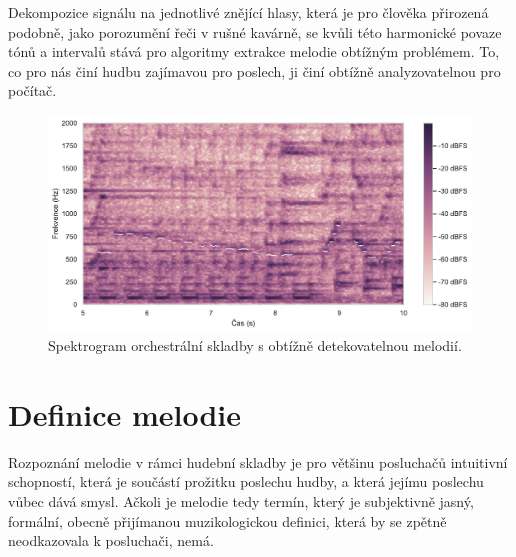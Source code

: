 Dekompozice signálu na jednotlivé znějící hlasy, která je pro člověka přirozená podobně, jako porozumění řeči v rušné kavárně, se kvůli této harmonické povaze tónů a intervalů stává pro algoritmy extrakce melodie obtížným problémem. To, co pro nás činí hudbu zajímavou pro poslech, ji činí obtížně analyzovatelnou pro počítač.



\begin{figure}[h]\centering
\includegraphics[width=\textwidth,height=\textheight,keepaspectratio]{../img/audio_mix_stft_2}
\caption{Spektrogram orchestrální skladby s obtížně detekovatelnou melodií.}
\label{obr:audio_mix_stft_2}
\end{figure}

\section{Definice melodie}

Rozpoznání melodie v rámci hudební skladby je pro většinu posluchačů intuitivní schopností, která je součástí prožitku poslechu hudby, a která jejímu poslechu vůbec dává smysl. Ačkoli je melodie tedy termín, který je subjektivně jasný, formální, obecně přijímanou muzikologickou definici, která by se zpětně neodkazovala k posluchači, nemá. 

